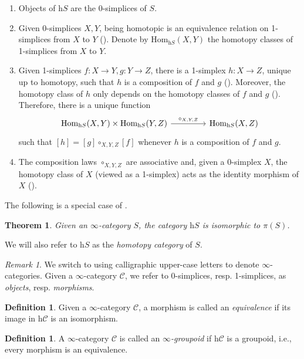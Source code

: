 \documentclass[a4paper]{book}
\newcommand{\lC}{\mathcal{C}}
\newcommand{\Ho}{\mathrm{h}} %
\renewcommand{\hom}{\mathrm{Hom}} %
\newtheorem{theorem}[equation]{Theorem}
\theoremstyle{definition}
\newtheorem{definition}[equation]{Definition}
\theoremstyle{remark}
\newtheorem{remark}[equation]{Remark}
\numberwithin{equation}{section}
\begin{document}
\begin{enumerate}
	\item Objects of $\Ho S$ are the 0-simplices of $S$.
	\item Given 0-simplices $X,Y$, being homotopic is an equivalence relation on 1-simplices from $X$ to $Y$ (\cite[Tag 003Z]{kerodon2026}). Denote by $\hom_{\Ho S}(X,Y)$ the homotopy classes of 1-simplices from $X$ to $Y$.
	\item Given 1-simplices $f:X\to Y,g:Y\to Z$, there is a 1-simplex $h:X\to Z$, unique up to homotopy, such that $h$ is a composition of $f$ and $g$ (\cite[Tag 0043]{kerodon2026}). Moreover, the homotopy class of $h$ only depends on the homotopy classes of $f$ and $g$ (\cite[Tag 0048]{kerodon2026}). Therefore, there is a unique function \begin{equation}
		\begin{tikzcd}[column sep=1.5cm]
			\hom_{\Ho S}(X,Y)\times\hom_{\Ho S}(Y,Z) \arrow[r,"\circ_{X,Y,Z}"] & \hom_{\Ho S}(X,Z)
		\end{tikzcd}
	\end{equation}  such that $[h]=[g]\circ_{X,Y,Z}[f]$ whenever $h$ is a composition of $f$ and $g$. 
	\item The composition laws $\circ_{X,Y,Z}$ are associative and, given a 0-simplex $X$, the homotopy class of $X$ (viewed as a 1-simplex) acts as the identity morphism of $X$ (\cite[Tag 004B]{kerodon2026}).
\end{enumerate}The following is a special case of \cite[Corollary 1.2.13]{land2021introduction}. 
\begin{theorem}Given an $\infty$-category $S$, the category $\Ho S$ is isomorphic to $\pi(S)$.
\end{theorem}We will also refer to $\Ho S$ as the \emph{homotopy category} of $S$. 
\begin{remark}
	We switch to using calligraphic upper-case letters to denote $\infty$-categories. Given a $\infty$-category $\lC$, we refer to 0-simplices, resp. 1-simplices, as \emph{objects}, resp. \emph{morphisms}. 
\end{remark}
\begin{definition}
	Given a $\infty$-category $\lC$, a morphism is called an \emph{equivalence} if its image in $\Ho\lC$ is an isomorphism. 
\end{definition}
\begin{definition}
	A $\infty$-category $\lC$ is called an \emph{$\infty$-groupoid} if $\Ho\lC$ is a groupoid, i.e., every morphism is an equivalence. 
\end{definition}
\end{document}
